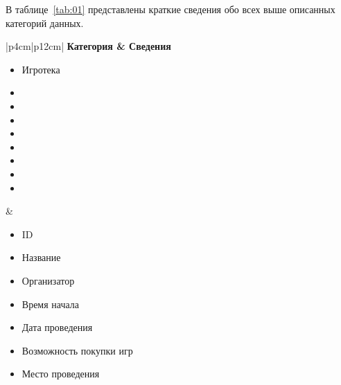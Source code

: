 В таблице~\ref{tab:01} представлены краткие сведения обо всех выше описанных
категорий данных.

\begin{table}[h!]
    \begin{center}
    \begin{threeparttable}
        \captionsetup{format=hang,justification=raggedright,
                      singlelinecheck=off}
        \caption{\label{tab:01}Категории данных и сведения о них}
        \renewcommand{\arraystretch}{1.5}
        \begin{tabular}{|p{4cm}|p{12cm}|}
            \hline
            \bfseries Категория & \bfseries Сведения\\
            \hline
            \begin{minipage}[t]{\linewidth}
              \begin{multicols}{1}
                \begin{itemize}[leftmargin=0mm,labelsep=0mm,nosep,after=\strut]
                  \item[] Игротека
                  \item[]
                  \item[]
                  \item[]
                  \item[]
                  \item[]
                  \item[]
                  \item[]
                  \item[]
                \end{itemize}
              \end{multicols}
            \end{minipage}
          & \begin{minipage}[t]{\linewidth}
              \begin{multicols}{2}
                \begin{itemize}[leftmargin=0mm,labelsep=0mm,nosep,after=\strut]
                  \item[] ID
                  \item[] Название
                  \item[] Организатор
                  \item[] Время начала
                  \item[] Дата проведения
                  \item[] Возможность покупки игр
                  \item[] Место проведения

\end{itemize}
\end{multicols}
\end{minipage}
\end{tabular}
\end{threeparttable}
\end{center}
\end{table}
